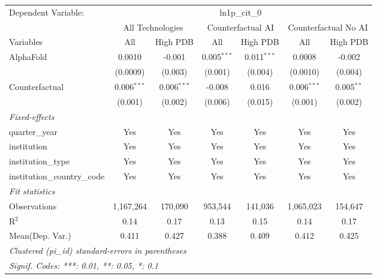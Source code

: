 \begingroup
\centering
\begin{tabular}{lcccccc}
   \tabularnewline \midrule \midrule
   Dependent Variable: & \multicolumn{6}{c}{ln1p\_cit\_0}\\
 & \multicolumn{2}{c}{All Technologies} & \multicolumn{2}{c}{Counterfactual AI} & \multicolumn{2}{c}{Counterfactual No AI} \\
\cmidrule(lr){1-1}\cmidrule(lr){2-3} \cmidrule(lr){4-5} \cmidrule(lr){6-7}
Variables & \multicolumn{1}{c}{All} & \multicolumn{1}{c}{High PDB} & \multicolumn{1}{c}{All} & \multicolumn{1}{c}{High PDB} & \multicolumn{1}{c}{All} & \multicolumn{1}{c}{High PDB} \\
\cmidrule(lr){1-1}\cmidrule(lr){2-2} \cmidrule(lr){3-3} \cmidrule(lr){4-4} \cmidrule(lr){5-5} \cmidrule(lr){6-6} \cmidrule(lr){7-7}
   AlphaFold                    & 0.0010        & -0.001        & 0.005$^{***}$ & 0.011$^{***}$ & 0.0008        & -0.002\\   
                                & (0.0009)      & (0.003)       & (0.001)       & (0.004)       & (0.0010)      & (0.004)\\   
   Counterfactual               & 0.006$^{***}$ & 0.006$^{***}$ & -0.008        & 0.016         & 0.006$^{***}$ & 0.005$^{**}$\\   
                                & (0.001)       & (0.002)       & (0.006)       & (0.015)       & (0.001)       & (0.002)\\   
   \midrule
   \emph{Fixed-effects}\\
   quarter\_year                & Yes           & Yes           & Yes           & Yes           & Yes           & Yes\\  
   institution                  & Yes           & Yes           & Yes           & Yes           & Yes           & Yes\\  
   institution\_type            & Yes           & Yes           & Yes           & Yes           & Yes           & Yes\\  
   institution\_country\_code   & Yes           & Yes           & Yes           & Yes           & Yes           & Yes\\  
   \midrule
   \emph{Fit statistics}\\
   Observations                 & 1,167,264     & 170,090       & 953,544       & 141,036       & 1,065,023     & 154,647\\  
   R$^2$                        & 0.14          & 0.17          & 0.13          & 0.15          & 0.14          & 0.17\\  
Mean(Dep. Var.) & 0.411 & 0.427 & 0.388 & 0.409 & 0.412 & 0.425 \\
   \midrule \midrule
   \multicolumn{7}{l}{\emph{Clustered (pi\_id) standard-errors in parentheses}}\\
   \multicolumn{7}{l}{\emph{Signif. Codes: ***: 0.01, **: 0.05, *: 0.1}}\\
\end{tabular}
\par\endgroup
